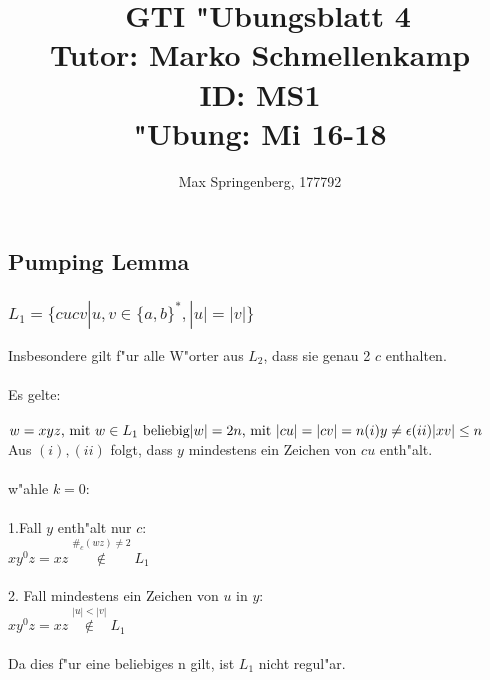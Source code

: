 \documentclass{article}
\author{Max Springenberg, 177792}
\title{\
    GTI "Ubungsblatt 4\\
    Tutor: Marko Schmellenkamp\\
    ID: MS1\\
    "Ubung: Mi 16-18
    }
\date{}
\newcommand{\eps}{\epsilon}
\begin{document}
\maketitle
\newpage

\subsection{Pumping Lemma}

\subsubsection{$L_1 = \{cucv | u,v \in \{a,b\}^*, |u| = |v|\}$}
Insbesondere gilt f"ur alle W"orter aus $L_2$, dass sie genau 2 $c$ enthalten.\\
\\
Es gelte:\\
\\
$w = xyz \text{, mit } w \in L_1 \text{ beliebig}\\
|w| = 2n \text{, mit } |cu| = |cv| = n\\
(i)     y \neq \eps\\
(ii)    |xv| \leq n\\$
\\
Aus $(i), (ii)$ folgt, dass $y$ mindestens ein Zeichen von $cu$ enth"alt.\\
\\
w"ahle $k=0$:\\
\\
1.Fall $y$ enth"alt nur $c$:\\
$xy^0z = xz \overset{\#_c(wz) \neq 2}{\not \in} L_1$\\
\\
2. Fall mindestens ein Zeichen von $u$ in $y$:\\
$xy^0z = xz \overset{|u| < |v|}{\not \in} L_1$\\
\\
Da dies f"ur eine beliebiges n gilt, ist $L_1$ nicht regul"ar.\\

\end{document}
